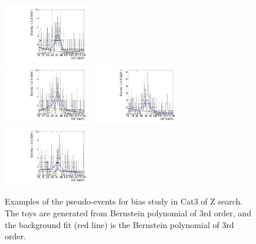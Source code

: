 \begin{figure}[!ht]
  \includegraphics[width=0.33\textwidth]{Fig/BiasStudy/Toys/ZJpsiG_Cat3/TruePdf2_FitPdf2_mu200_sbfit_12327_cat3}\\
  \includegraphics[width=0.33\textwidth]{Fig/BiasStudy/Toys/ZJpsiG_Cat3/TruePdf2_FitPdf2_mu200_sbfit_12315_cat3}~
  \includegraphics[width=0.33\textwidth]{Fig/BiasStudy/Toys/ZJpsiG_Cat3/TruePdf2_FitPdf2_mu200_sbfit_12316_cat3}~
  \includegraphics[width=0.33\textwidth]{Fig/BiasStudy/Toys/ZJpsiG_Cat3/TruePdf2_FitPdf2_mu200_sbfit_12318_cat3}\\
  \caption{Examples of the pseudo-events for bias study in Cat3 of Z search. The toys are generated from Bernstein polynomial of 3rd order, and the background fit (red line) is the Bernstein polynomial of 3rd order.}
  \label{fig:Toys_ZJpsiG_Cat3}
\end{figure}
\clearpage